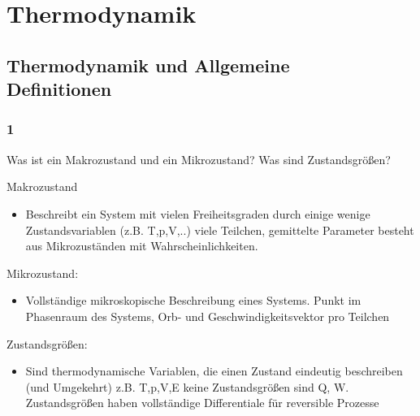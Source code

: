 \documentclass[12pt,a4paper]{report}
\author{\theauthor}
\title{\thetitle}
\newenvironment{myfrag}{\begin{it}}{\end{it}\vspace{3mm}\par}
\numberwithin{equation}{section}
\begin{document}
\maketitle%
\begin{abstract}
Die vorliegende Fragensammlung besteht aus den mit den Übungsblättern verteilten Verständ-nisfragen zur Vorlesung "Thermodynamik und Statistik" (früher "Statistische Mechanik") aus dem Sommersemester 2014 von Prof. Eggert, TU Kaiserslautern.\\
Sie wurde als Hilfsmittel zur Klausur- und Prüfungsvorbereitung von Studenten für Studenten geschrieben und keineswegs fehlerfrei, eventuelle inhaaltliche Fehler werden aber gerne korrigiert. Rechschreibfehler dürfen vom Finder behalten werden.
\end{abstract}
\tableofcontents%
\chapter{Thermodynamik}
\section{Thermodynamik und Allgemeine\\Definitionen}
\subsection{1}
\begin{myfrag}
Was ist ein Makrozustand und ein Mikrozustand?
Was sind Zustandsgrößen?
\end{myfrag} \qquad \newline
Makrozustand 
\begin{itemize}
\item Beschreibt ein System mit vielen Freiheitsgraden durch einige wenige Zustandsvariablen (z.B. T,p,V,..) viele Teilchen, gemittelte Parameter besteht aus Mikrozuständen mit Wahrscheinlichkeiten.
\end{itemize}
Mikrozustand:
\begin{itemize}
\item Vollständige mikroskopische Beschreibung eines Systems. Punkt im Phasenraum des Systems, Orb- und Geschwindigkeitsvektor pro Teilchen
\end{itemize}
Zustandsgrößen:
\begin{itemize}
\item Sind thermodynamische Variablen, die einen Zustand eindeutig beschreiben (und Umgekehrt) z.B. T,p,V,E keine Zustandsgrößen sind Q, W. Zustandsgrößen haben vollständige Differentiale für reversible Prozesse
\end{itemize}
\end{document}
